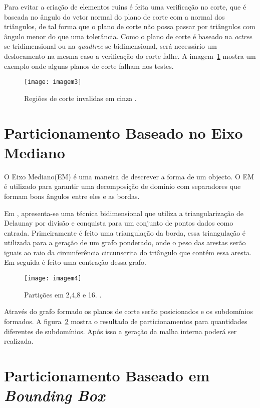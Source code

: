Para evitar a criação de elementos ruins é feita uma verificação no corte, que é baseada no ângulo do vetor normal do plano de corte com a normal dos triângulos, de tal forma que o plano de corte não possa passar por triângulos com ângulo menor do que uma tolerância. Como o plano de corte é baseado na \textit{octree} se tridimensional ou na \textit{quadtree} se bidimensional, será necessário um deslocamento na mesma caso a verificação do corte falhe. A imagem~\ref{fig:imagem3} mostra um exemplo onde alguns planos de corte falham nos testes.

 \begin{figure}[htbp]
     \centering
     \texttt{[image: imagem3]}
     \caption{Regiões de corte invalidas em cinza \cite{bib:Larwood03}.}
     \label{fig:imagem3}
 \end{figure}

\section{Particionamento Baseado no Eixo Mediano}

O Eixo Mediano(EM) é uma maneira de descrever a forma de um objecto. O EM é utilizado para garantir uma decomposição de domínio com separadores que formam bons ângulos entre eles e as bordas. 

Em \cite{bib:Leonidas06}, apresenta-se uma técnica bidimensional que utiliza a triangularização de Delaunay por divisão e conquista para um conjunto de pontos dados como entrada. Primeiramente é feito uma triangulação da borda, essa triangulação é utilizada para a geração de um grafo ponderado, onde o peso das arestas serão iguais ao raio da circunferência circunscrita do triângulo que contém essa aresta. Em seguida é feito uma contração dessa grafo. 

 \begin{figure}[htbp]
     \centering
     \texttt{[image: imagem4]}
     \caption{Partições em 2,4,8 e 16. \cite{bib:Leonidas06}.}
     \label{fig:imagem4}
 \end{figure}

Através do grafo formado os planos de corte serão posicionados e os subdomínios formados. A figura~\ref{fig:imagem4} mostra o resultado de particionamentos para quantidades diferentes de subdomínios. Após isso a geração da malha interna poderá ser realizada.

\section{Particionamento Baseado em \textit{Bounding Box}}

